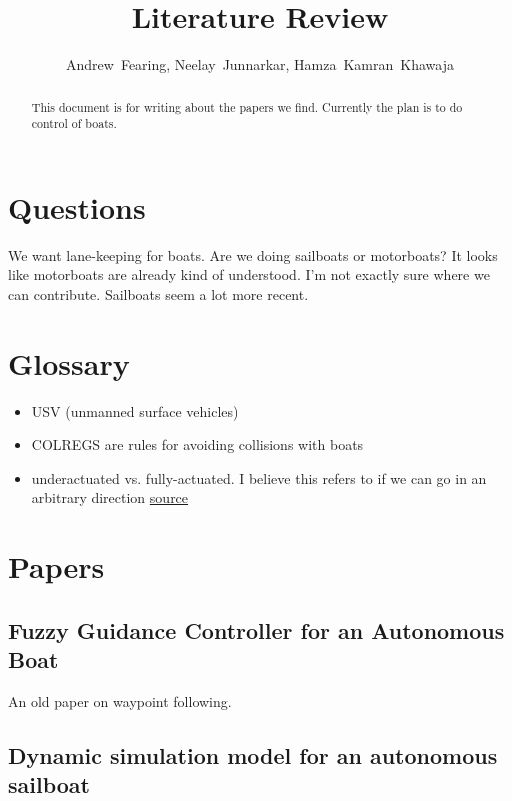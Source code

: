 \documentclass[conference]{IEEEtran}
\begin{document}
\title{Literature Review}
\author{Andrew~Fearing, Neelay~Junnarkar,  Hamza~Kamran~Khawaja}
\maketitle

\begin{abstract}
This document is for writing about the papers we find. Currently the plan is to do control of boats.
\end{abstract}

\section{Questions}
We want lane-keeping for boats. Are we doing sailboats or motorboats? It looks like motorboats are already kind of understood. I'm not exactly sure where we can contribute. Sailboats seem a lot more recent.


\section{Glossary}
\begin{itemize}
    \item USV (unmanned surface vehicles)
    \item COLREGS are rules for avoiding collisions with boats
    \item underactuated vs. fully-actuated. I believe this refers to if we can go in an arbitrary direction  \href{https://ocw.mit.edu/courses/electrical-engineering-and-computer-science/6-832-underactuated-robotics-spring-2009/readings/MIT6_832s09_read_ch01.pdf}{source}
\end{itemize}

\section{Papers}
\subsection{Fuzzy Guidance Controller for an Autonomous Boat}
\cite{Vaneck1997} An old paper on waypoint following.


\subsection{Dynamic simulation model for an autonomous sailboat}
\end{document}
